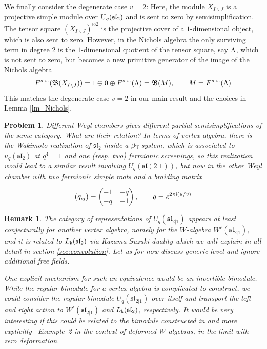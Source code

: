 \documentclass[a4paper, reqno]{amsart}
\newtheorem{problem}[theorem]{Problem}
\newtheorem{remark}[theorem]{Remark}
\theoremstyle{introTheorems}
\renewcommand\sl{\mathfrak{sl}}
\renewcommand{\1}{\mathbbold{1}}
\begin{document}
\bigskip

We finally consider the degenerate case $v=2$: Here, the module $X_{I\backslash J}$ is a projective simple module over $\Uq(\sl_2)$ and is sent to zero by semisimplification. The tensor square $(X_{I\backslash J})^{\otimes 2}$ is the projective cover of a $1$-dimensional object, which is also sent to zero. However, in the Nichols algebra  the only surviving term in degree $2$ is the $1$-dimensional quotient of the tensor square,  say $\Lambda$, which is not sent to zero, but becomes a new primitive generator of the image of the Nichols algebra 
$$F^{s.s.}(\mathfrak{B}(X_{I\backslash J}))=1\oplus 0 \oplus F^{s.s.}(\Lambda)=\mathfrak{B}(M),\qquad M=F^{s.s.}(\Lambda)$$
This matches the degenerate case $v=2$ in our main result and the choices in Lemma \ref{lm_Nichols}.

\begin{problem}
Different Weyl chambers gives different partial semisimplifications of the same category. What are their relation? In terms of vertex algebra, there is the Wakimoto realization of $\mathfrak{sl}_2$ inside a $\beta\gamma$-system, which is associated to $u_q(\sl_2)$ at $q^4=1$ and one (resp. two)  fermionic screenings, so this realization would lead to a similar result involving $U_q(\sl(2|1))$, but now in the other Weyl chamber with two fermionic simple roots and a braiding matrix 

\[
(q_{ij})=\begin{pmatrix} -1 & -q \\ -q & -1 \end{pmatrix},\qquad q=e^{2\pi\mathrm{i}(u/v)}
\]

\end{problem}

\begin{remark}\label{rem:Mukhin}
The category of representations of $U_q(\sl_{2|1})$ appears at least conjecturally for another vertex algebra, namely for the $W$-algebra $W^\ell(\sl_{2|1})$, and it is related to $L_{\mathsf{k}}(\mathfrak{sl}_2)$ via Kazama-Suzuki duality which we will explain in all detail in section \ref{sec:convolution}.
Let us for now discuss generic level and ignore additional free fields. 

One explicit mechanism for such an equivalence would be an invertible bimodule. While the regular bimodule for a vertex algebra is complicated to construct, we could consider the regular bimodule $U_q(\sl_{2|1})$ over itself and transport the left and right action to  $W^\ell(\sl_{2|1})$ and $L_{\mathsf{k}}(\mathfrak{sl}_2)$, respectively. It would be very interesting if this could be related to the bimodule constructed in \cite{FJM25} and more explicitly \cite{FJM26}~Example~2 in the context of deformed $W$-algebras, in the limit with zero deformation.
\end{remark}
\end{document}
